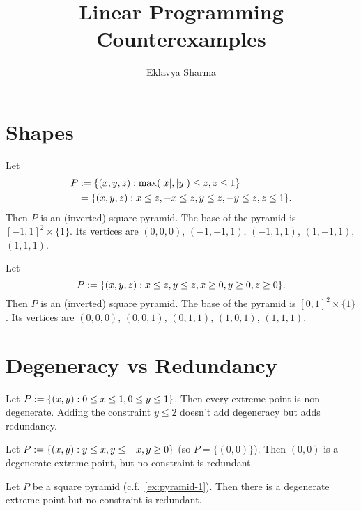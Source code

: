 \documentclass[a4paper,12pt,fleqn]{article}
\author{Eklavya Sharma}
\date{\empty}
\title{Linear Programming Counterexamples}
\begin{document}
\maketitle
\setlength{\parskip}{0.2em}

\section{Shapes}

\begin{example}
\label{ex:pyramid-1}
Let
\begin{align*}
P &:= \{(x, y, z): \max(|x|, |y|) \le z, z \le 1\}
\\ &= \{(x, y, z): x \le z, -x \le z, y \le z, -y \le z, z \le 1\}.
\end{align*}
Then $P$ is an (inverted) square pyramid.
The base of the pyramid is $[-1, 1]^2 \times \{1\}$.
Its vertices are $(0, 0, 0)$, $(-1, -1, 1)$, $(-1, 1, 1)$, $(1, -1, 1)$, $(1, 1, 1)$.
\end{example}

\begin{example}
\label{ex:pyramid-2}
Let
\[ P := \{(x, y, z): x \le z, y \le z, x \ge 0, y \ge 0, z \ge 0\}. \]
Then $P$ is an (inverted) square pyramid.
The base of the pyramid is $[0, 1]^2 \times \{1\}$.
Its vertices are $(0, 0, 0)$, $(0, 0, 1)$, $(0, 1, 1)$, $(1, 0, 1)$, $(1, 1, 1)$.
\end{example}

\section{Degeneracy vs Redundancy}

\begin{example}
Let $P := \{(x, y): 0 \le x \le 1, 0 \le y \le 1\}$.
Then every extreme-point is non-degenerate.
Adding the constraint $y \le 2$ doesn't add degeneracy but adds redundancy.
\end{example}

\begin{example}
Let $P := \{(x, y): y \le x, y \le -x, y \ge 0\}$ (so $P = \{(0, 0)\}$).
Then $(0, 0)$ is a degenerate extreme point, but no constraint is redundant.
\end{example}

\begin{example}
Let $P$ be a square pyramid (c.f.~\cref{ex:pyramid-1}).
Then there is a degenerate extreme point but no constraint is redundant.
\end{example}
\end{document}
